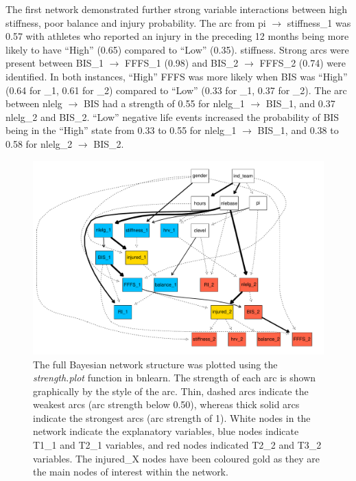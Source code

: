\documentclass[
  english,
  man,floatsintext]{apa6}
\begin{document}
The first network demonstrated further strong variable interactions between high stiffness, poor balance and injury probability.
The arc from pi \(\rightarrow\) stiffness\_1 was 0.57 with athletes who reported an injury in the preceding 12 months being more likely to have ``High'' (0.65) compared to ``Low'' (0.35). stiffness.
Strong arcs were present between BIS\_1 \(\rightarrow\) FFFS\_1 (0.98) and BIS\_2 \(\rightarrow\) FFFS\_2 (0.74) were identified.
In both instances, ``High'' FFFS was more likely when BIS was ``High'' (0.64 for \_1, 0.61 for \_2) compared to ``Low'' (0.33 for \_1, 0.37 for \_2).
The arc between nlelg \(\rightarrow\) BIS had a strength of 0.55 for nlelg\_1 \(\rightarrow\) BIS\_1, and 0.37 nlelg\_2 and BIS\_2.
``Low'' negative life events increased the probability of BIS being in the ``High'' state from 0.33 to 0.55 for nlelg\_1 \(\rightarrow\) BIS\_1, and 0.38 to 0.58 for nlelg\_2 \(\rightarrow\) BIS\_2.

\newpage

\begin{figure}
\centering
\includegraphics{apa_style_files/figure-latex/fig6-1.pdf}
\caption{\label{fig:fig6}The full Bayesian network structure was plotted using the \emph{strength.plot} function in bnlearn. The strength of each arc is shown graphically by the style of the arc. Thin, dashed arcs indicate the weakest arcs (arc strength below 0.50), whereas thick solid arcs indicate the strongest arcs (arc strength of 1). White nodes in the network indicate the explanatory variables, blue nodes indicate T1\_1 and T2\_1 variables, and red nodes indicated T2\_2 and T3\_2 variables. The injured\_X nodes have been coloured gold as they are the main nodes of interest within the network.}
\end{figure}
\end{document}
